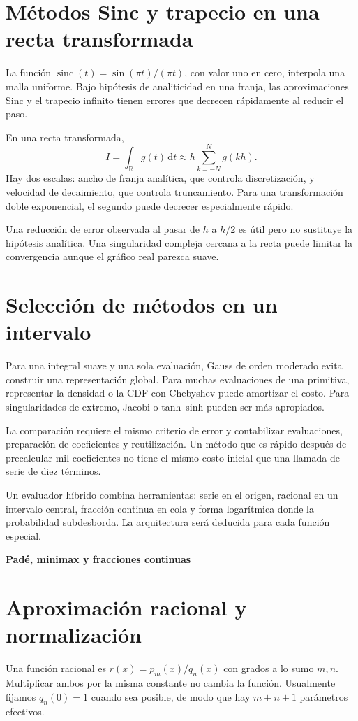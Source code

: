 \documentclass[11pt,a4paper]{article}
\newcommand{\R}{\mathbb R}
\newcommand{\dd}{\,\mathrm d}
\theoremstyle{definition}
\newcommand{\parte}[1]{\par\bigskip\Needspace{8\baselineskip}\begin{center}{\Large\bfseries\color{azul}#1}\end{center}}
\begin{document}
\section{Métodos Sinc y trapecio en una recta transformada}
La función $\operatorname{sinc}(t)=\sin(\pi t)/(\pi t)$, con valor uno en cero, interpola una malla uniforme. Bajo hipótesis de analiticidad en una franja, las aproximaciones Sinc y el trapecio infinito tienen errores que decrecen rápidamente al reducir el paso.

En una recta transformada,
\[
I=\int_\R g(t)\dd t\approx h\sum_{k=-N}^Ng(kh).
\]
Hay dos escalas: ancho de franja analítica, que controla discretización, y velocidad de decaimiento, que controla truncamiento. Para una transformación doble exponencial, el segundo puede decrecer especialmente rápido.

Una reducción de error observada al pasar de $h$ a $h/2$ es útil pero no sustituye la hipótesis analítica. Una singularidad compleja cercana a la recta puede limitar la convergencia aunque el gráfico real parezca suave.

\section{Selección de métodos en un intervalo}
Para una integral suave y una sola evaluación, Gauss de orden moderado evita construir una representación global. Para muchas evaluaciones de una primitiva, representar la densidad o la CDF con Chebyshev puede amortizar el costo. Para singularidades de extremo, Jacobi o tanh--sinh pueden ser más apropiados.

La comparación requiere el mismo criterio de error y contabilizar evaluaciones, preparación de coeficientes y reutilización. Un método que es rápido después de precalcular mil coeficientes no tiene el mismo costo inicial que una llamada de serie de diez términos.

Un evaluador híbrido combina herramientas: serie en el origen, racional en un intervalo central, fracción continua en cola y forma logarítmica donde la probabilidad subdesborda. La arquitectura será deducida para cada función especial.



\parte{Padé, minimax y fracciones continuas}
\section{Aproximación racional y normalización}
Una función racional es $r(x)=p_m(x)/q_n(x)$ con grados a lo sumo $m,n$. Multiplicar ambos por la misma constante no cambia la función. Usualmente fijamos $q_n(0)=1$ cuando sea posible, de modo que hay $m+n+1$ parámetros efectivos.
\end{document}
